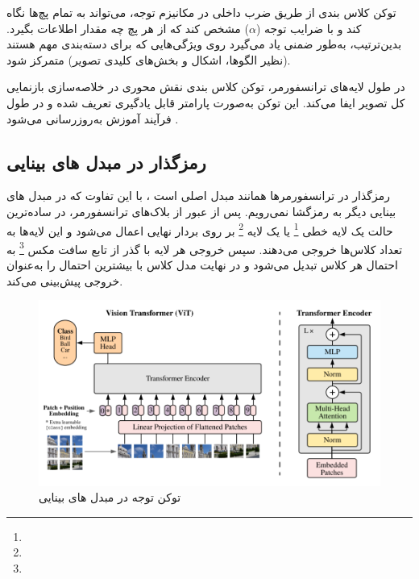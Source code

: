 توکن کلاس بندی از طریق ضرب داخلی در مکانیزم توجه، می‌تواند به تمام پچ‌ها نگاه کند و با ضرایب توجه (\(\alpha\)) مشخص کند که از هر پچ چه مقدار اطلاعات بگیرد. بدین‌ترتیب، به‌طور ضمنی یاد می‌گیرد روی ویژگی‌هایی که برای دسته‌بندی مهم هستند (نظیر الگوها، اشکال و بخش‌های کلیدی تصویر) متمرکز شود.

در طول لایه‌های ترانسفورمر، توکن کلاس بندی نقش محوری در خلاصه‌سازی بازنمایی کل تصویر ایفا می‌کند. این توکن به‌صورت پارامتر قابل یادگیری تعریف شده و در طول فرآیند آموزش به‌روزرسانی می‌شود \cite{devlin2018bert,dosovitskiy2020image}.

\subsection{رمزگذار در مبدل های بینایی}

رمزگذار در ترانسفورمرها همانند مبدل اصلی است \cite{vaswani2017attention}، با این تفاوت که در مبدل های بینایی \cite{dosovitskiy2020image} دیگر به رمزگشا نمی‌رویم. پس از عبور از بلاک‌های ترانسفورمر، در ساده‌ترین حالت یک لایه خطی \footnote{} یا یک لایه  \footnote{} بر روی بردار نهایی اعمال می‌شود و این لایه‌ها به تعداد کلاس‌ها خروجی می‌دهند.  
سپس خروجی هر لایه با گذر از تابع سافت مکس \footnote{} به احتمال هر کلاس تبدیل می‌شود و در نهایت مدل کلاس با بیشترین احتمال را به‌عنوان خروجی پیش‌بینی می‌کند.

\begin{figure}[h]
	\centering
	\begin{minipage}[b]{0.9\textwidth}
		\centering
		\includegraphics[width=\textwidth]{transformer_images/vision_transformer_after_embedding.png}
		\caption{توکن توجه در مبدل های بینایی}
		\label{fig:Cls Token In Vision Transformer}
	\end{minipage}
	\hfill
\end{figure}


